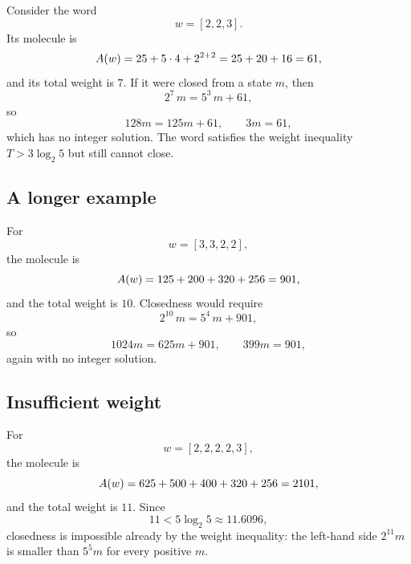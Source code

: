 Consider the word
\begin{equation*}
  w=[2,2,3].
\end{equation*}
Its molecule is
\begin{equation*}
  A(w)=25+5\cdot4+2^{2+2}=25+20+16=61,
\end{equation*}
and its total weight is $7$.  If it were closed from a state $m$, then
\begin{equation*}
  2^7\,m=5^3\,m+61,
\end{equation*}
so
\begin{equation*}
  128m=125m+61,
  \qquad
  3m=61,
\end{equation*}
which has no integer solution.  The word satisfies the weight
inequality $T>3\log_2 5$ but still cannot close.

\subsection{A longer example}

For
\begin{equation*}
  w=[3,3,2,2],
\end{equation*}
the molecule is
\begin{equation*}
  A(w)=125+200+320+256=901,
\end{equation*}
and the total weight is $10$.  Closedness would require
\begin{equation*}
  2^{10}\,m=5^4\,m+901,
\end{equation*}
so
\begin{equation*}
  1024m=625m+901,
  \qquad
  399m=901,
\end{equation*}
again with no integer solution.

\subsection{Insufficient weight}

For
\begin{equation*}
  w=[2,2,2,2,3],
\end{equation*}
the molecule is
\begin{equation*}
  A(w)=625+500+400+320+256=2101,
\end{equation*}
and the total weight is $11$.  Since
\begin{equation*}
  11<5\log_2 5\approx11.6096,
\end{equation*}
closedness is impossible already by the weight inequality: the
left-hand side $2^{11}m$ is smaller than $5^5m$ for every positive
$m$.


